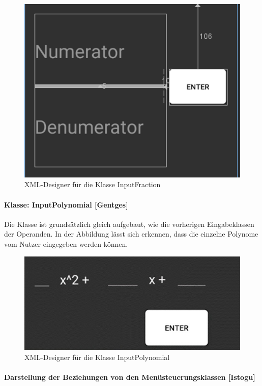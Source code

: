 \begin{figure}[h]
\includegraphics[width=0.5\columnwidth]{img/xml_InputFraction}
\caption[XML-Designer für die Klasse InputFraction]{XML-Designer für die Klasse InputFraction\footnotemark}
\end{figure}
\FloatBarrier

\paragraph{Klasse: InputPolynomial [Gentges]}

Die Klasse ist grundsätzlich gleich aufgebaut, wie die vorherigen Eingabeklassen der Operanden. In der Abbildung lässt sich erkennen, dass die einzelne Polynome vom Nutzer eingegeben werden können.

\begin{figure}[h]
	\includegraphics[width=0.6\columnwidth]{img/xml_InputPolynomial}
	\caption[XML-Designer für die Klasse InputPolynomial]{XML-Designer für die Klasse InputPolynomial\footnotemark}
\end{figure}
\FloatBarrier

\paragraph{Darstellung der Beziehungen von den Menüsteuerungsklassen [Istogu]}

